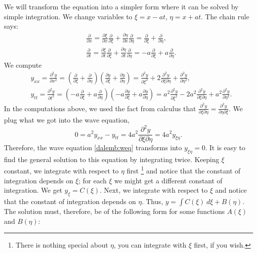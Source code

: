 \documentclass{ximera}
\begin{document}
We will transform the equation into a simpler form where it can be solved by simple integration. We change variables to $\xi = x - at$, $\eta = x + at$. The chain rule says:
\begin{align*}
    & \frac{\partial}{\partial x}
    = \frac{\partial \xi}{\partial x} \frac{\partial}{\partial \xi} + \frac{\partial \eta}{\partial x}
    \frac{\partial}{\partial \eta}
    = \frac{\partial}{\partial \xi} + \frac{\partial}{\partial \eta} , \\
    & \frac{\partial}{\partial t}
    = \frac{\partial \xi}{\partial t} \frac{\partial}{\partial \xi} + \frac{\partial \eta}{\partial t} \frac{\partial}{\partial \eta}
    = -a \frac{\partial}{\partial \xi} + a \frac{\partial}{\partial \eta} .
\end{align*}
We compute
\begin{align*}
    & y_{xx} = \frac{\partial^2 y}{\partial x^2}=
    \left(
        \frac{\partial}{\partial \xi} + \frac{\partial}{\partial \eta}
    \right)
    \left(
        \frac{\partial y}{\partial \xi} + \frac{\partial y}{\partial \eta} 
    \right)
    = \frac{\partial^2 y}{\partial \xi^2} + 2 \frac{\partial^2 y}{\partial \xi \partial \eta}
    + \frac{\partial^2 y}{\partial \eta^2} , \\
    & y_{tt} = \frac{\partial^2 y}{\partial t^2} = 
    \left(
        -a \frac{\partial}{\partial \xi} + a \frac{\partial}{\partial \eta}
    \right)
    \left(
        -a \frac{\partial y}{\partial \xi} + a \frac{\partial y}{\partial \eta}
    \right)
    = a^2 \frac{\partial^2 y}{\partial \xi^2} - 2 a^2 \frac{\partial^2 y}{\partial \xi \partial \eta} + a^2 \frac{\partial^2 y}{\partial \eta^2} .
\end{align*}
In the computations above, we used the fact from calculus that 
$\frac{\partial^2 y}{\partial \xi \partial \eta} = \frac{\partial^2 y}{\partial \eta \partial \xi}$. 
We plug what we got into the wave equation,
\begin{equation*}
    0 = a^2 y_{xx} - y_{tt} = 4 a^2 \frac{\partial^2 y}{\partial \xi \partial \eta} = 4 a^2 y_{\xi\eta} .
\end{equation*}
Therefore, the wave equation \eqref{dalemb:weq} transforms into $y_{\xi\eta} = 0$. It is easy to find the general solution to this equation by integrating twice.  Keeping $\xi$ constant, we integrate with respect to $\eta$ first%
\footnote{There is nothing special about $\eta$, you can integrate with $\xi$ first, if you wish.}
and notice that the constant of integration depends on $\xi$; for each $\xi$ we might get a different constant of integration.  We get $y_{\xi} = C(\xi)$. Next, we integrate with respect to $\xi$ and notice that the constant of integration depends on $\eta$. Thus, $y = \int C(\xi) ~ d\xi + B(\eta)$. The solution must, therefore, be of the following form for some functions $A(\xi)$ and $B(\eta)$:
\end{document}

